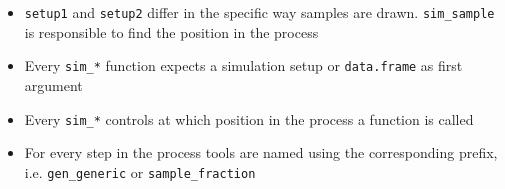 \begin{Shaded}
\end{Shaded}

\begin{itemize}
\itemsep1pt\parskip0pt
\item
  \texttt{setup1} and \texttt{setup2} differ in the specific way samples
  are drawn. \texttt{sim\_sample} is responsible to find the position in
  the process
\item
  Every \texttt{sim\_*} function expects a simulation setup or
  \texttt{data.frame} as first argument
\item
  Every \texttt{sim\_*} controls at which position in the process a
  function is called
\item
  For every step in the process tools are named using the corresponding
  prefix, i.e. \texttt{gen\_generic} or \texttt{sample\_fraction}
\end{itemize}

